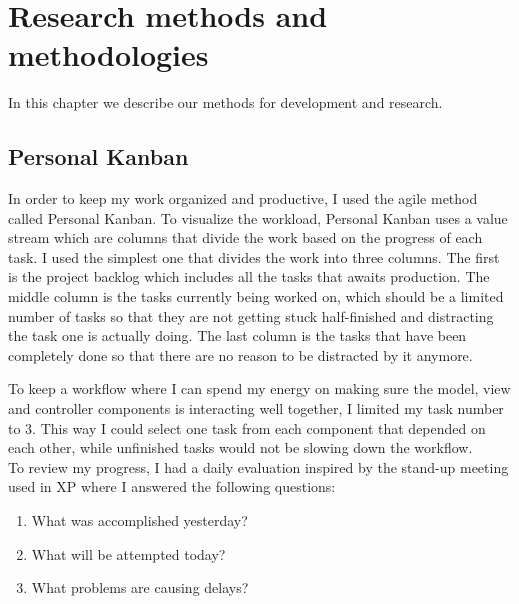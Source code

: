 
\chapter{Research methods and methodologies} %

\label{Chapter3} %

In this chapter we describe our methods for development and research.

\section{Personal Kanban}
In order to keep my work organized and productive, I used the agile method called Personal Kanban. To visualize the workload, Personal Kanban uses a value stream which are columns that divide the work based on the progress of each task. I used the simplest one that divides the work into three columns. The first is the project backlog which includes all the tasks that awaits production. The middle column is the tasks currently being worked on, which should be a limited number of tasks so that they are not getting stuck half-finished and distracting the task one is actually doing. The last column is the tasks that have been completely done so that there are no reason to be distracted by it anymore. \parencite{benson2009}

To keep a workflow where I can spend my energy on making sure the model, view and controller components is interacting well together, I limited my task number to 3. This way I could select one task from each component that depended on each other, while unfinished tasks would not be slowing down the workflow.\\
To review my progress, I had a daily evaluation inspired by the stand-up meeting used in XP \parencite{wells1999} where I answered the following questions:
\begin{enumerate}
\item What was accomplished yesterday?
\item What will be attempted today?
\item What problems are causing delays?
\end{enumerate}



